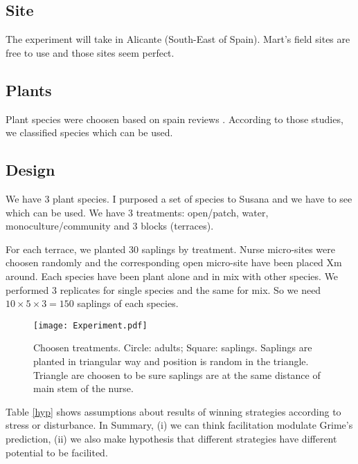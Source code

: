 \documentclass[12pt]{article} %
\begin{document}
\subsection{Site}

The experiment will take in Alicante (South-East of Spain). Mart's field sites are free to use and those sites seem perfect.

\subsection{Plants}

Plant species were choosen based on spain reviews \citep{McCluney2012,Navarro2006, Jauffret2003}. According to those studies, we classified species which can be used.



\subsection{Design}

We have 3 plant species. I purposed a set of species to Susana and we have to see which can be used. We have 3 treatments: open/patch, water, monoculture/community and 3 blocks (terraces).

For each terrace, we planted 30 saplings by treatment. Nurse micro-sites were choosen randomly and the corresponding open micro-site have been placed Xm around. Each species have been plant alone and in mix with other species. We performed 3 replicates for single species and the same for mix. So we need $10\times5\times3=150$ saplings of each species.


\begin{figure} %
\begin{center}
\texttt{[image: Experiment.pdf]}
\end{center}
\caption{Choosen treatments. Circle: adults; Square: saplings. Saplings are planted in triangular way and position is random in the triangle. Triangle are choosen to be sure saplings are at the same distance of main stem of the nurse. \label{exp}}
\end{figure}

Table \ref{hyp} shows assumptions about results of winning strategies according to stress or disturbance. In Summary, (i) we can think facilitation modulate Grime's prediction, (ii) we also make hypothesis that different strategies have different potential to be facilited.
\end{document}
